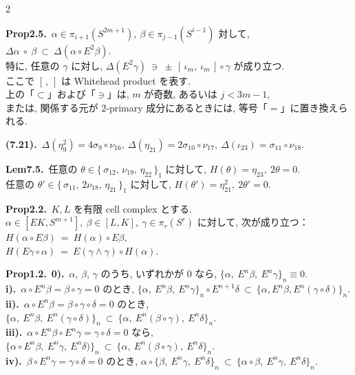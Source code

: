 \documentclass[10pt, leqno]{ltjsarticle}
\newcommand{\Ex}{E}        %
\newcommand{\todai}[2][]{\{\,#2\,\}_{#1}}      %
\numberwithin{equation}{section}
\theoremstyle{plain}
\theoremstyle{definition}
\theoremstyle{remark}
\begin{document}
\begin{paracol}{2}
\switchcolumn

\noindent
\textbf{Prop2.5.}\
$\alpha\in\pi_{i+1}(S^{2m+1}), \ \beta\in \pi_{j-1}(S^{i-1})$ 対して, 
\(
\Delta\alpha\ \circ\ \beta\ \subset\ \Delta(\alpha\circ E^2\beta).
\)\\
特に, 任意の $\gamma$ に対し,
\(
\Delta(E^2\gamma)\ \ni\ \pm\,[\,\iota_m,\ \iota_m\,]\circ\gamma
\)
が成り立つ. \\
ここで $[\, ,\,]$ は Whitehead product を表す. \\
上の「$\subset$」および「$\ni$」は, $m$ が奇数, 
あるいは $j<3m-1$, \\
または, 関係する元が \(2\)-primary 成分にあるときには, 
等号「$=$」に置き換えられる. 

\noindent
\textbf{(7.21).}\
\(\Delta(\eta_{9}^{2})=4\sigma_{9}\circ\nu_{16},\
\Delta(\eta_{21})=2\sigma_{10}\circ\nu_{17},\
\Delta(\iota_{23})=\sigma_{11}\circ\nu_{18}.\)

\noindent
\textbf{Lem7.5.}\
任意の \(\theta\in\todai[1]{\sigma_{12},\,\nu_{19},\,\eta_{22}}\) に対して,
\(H(\theta)=\eta_{23},\ 2\theta=0.\)\\
任意の \(\theta'\in\todai[1]{\sigma_{11},\,2\nu_{18},\,\eta_{21}}\) に対して,
\(H(\theta')=\eta_{21}^{2},\ 2\theta'=0.\)

\noindent
\textbf{Prop2.2.}\
$K,L$ を有限 cell complex とする. \\
$\alpha\in[EK, S^{m+1}], \ \beta\in[L,K], \ \gamma\in\pi_r(S^r)$ 
に対して, 次が成り立つ：\\
\(
H(\alpha\circ E\beta)\ =\ H(\alpha)\circ E\beta,
\)\\
\(
H(E\gamma\circ\alpha)\ =\ E(\gamma\wedge\gamma)\circ H(\alpha).
\)

\noindent
\textbf{Prop1.2.}\
\textbf{0).}\ $\alpha$, $\beta$, $\gamma$ のうち, いずれかが $0$ なら,
\(
\{\alpha,\ \Ex^n\beta,\ \Ex^n\gamma\}_n\equiv0.
\)\\
\textbf{i).}\ $\alpha\circ \Ex^n\beta=\beta\circ\gamma=0$ のとき,
\(
\{\alpha,\ \Ex^n\beta,\ \Ex^n\gamma\}_n\circ\Ex^{n+1}\delta\ \subset\ \{\alpha,\Ex^n \beta, \Ex^n(\gamma\circ\delta)\}_n.
\)\\
\textbf{ii).}\ $\alpha\circ \Ex^n\beta=\beta\circ\gamma\circ\delta=0$ のとき,
\(
\{\alpha,\ \Ex^n\beta,\ \Ex^n(\gamma\circ\delta)\}_n\ \subset\ \{\alpha,\ \Ex^n(\beta\circ\gamma),\ \Ex^n\delta\}_n .
\)\\
\textbf{iii).}\ $\alpha\circ\Ex^n\beta\circ\Ex^n\gamma=\gamma\circ\delta=0$ なら,
\(
\{\alpha\circ\Ex^n\beta,\ \Ex^n\gamma,\ \Ex^n\delta)\}_n\ \subset\ \{\alpha,\ \Ex^n(\beta\circ\gamma),\ \Ex^n\delta\}_n .
\)\\
\textbf{iv).}\ $\beta\circ\Ex^n\gamma=\gamma\circ\delta=0$ のとき,
\(
\alpha\circ\{\beta,\ \Ex^n\gamma,\ \Ex^n\delta\}_n\ \subset\ \{\alpha\circ\beta,\ \Ex^n\gamma,\ \Ex^n\delta\}_n .
\)


\end{paracol}
\end{document}
